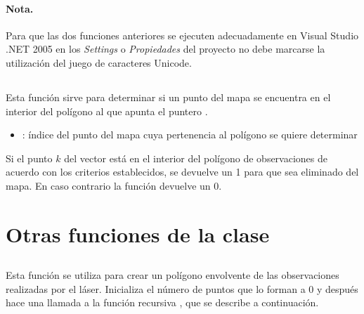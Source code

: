 \paragraph{Nota.}
Para que las dos funciones anteriores se ejecuten adecuadamente en Visual Studio .NET 2005 en los \emph{Settings} o \emph{Propiedades} del proyecto no debe marcarse la utilización del juego de caracteres Unicode.

\subsection{}\label{PuntoEnPol}


\noindent
Esta función sirve para determinar si un punto del mapa se encuentra en el interior del polígono al que apunta el puntero .

\begin{itemize}
  \item {}: índice del punto del mapa cuya pertenencia al polígono se quiere determinar
\end{itemize}

Si el punto $k$ del vector  está en el interior del polígono de observaciones de acuerdo con los criterios establecidos, se devuelve un 1 para que sea eliminado del mapa. En caso contrario la función devuelve un 0.


\section { Otras funciones de la clase }

\subsection {}


\noindent
Esta función se utiliza para crear un polígono envolvente de las observaciones realizadas por el láser.
Inicializa el número de puntos que lo forman a 0 y después hace una llamada a la función recursiva , que se describe a continuación.

\subsection {}



